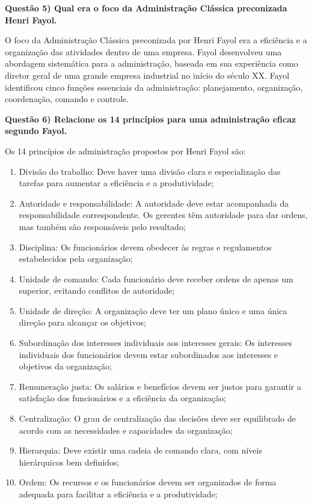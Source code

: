 \documentclass[11pt]{article}
\begin{document}
\noindent \textbf{Questão 5) Qual era o foco da Administração Clássica preconizada Henri Fayol.}\par
O foco da Administração Clássica preconizada por Henri Fayol era a eficiência e a organização das atividades dentro de uma empresa. Fayol desenvolveu uma abordagem sistemática para a administração, baseada em sua experiência como diretor geral de uma grande empresa industrial no início do século XX. Fayol identificou cinco funções essenciais da administração: planejamento, organização, coordenação, comando e controle.\par

\noindent \textbf{Questão 6) Relacione os 14 princípios para uma administração eficaz segundo Fayol.}\par
Os 14 princípios de administração propostos por Henri Fayol são:
\begin{enumerate}
    \item Divisão do trabalho: Deve haver uma divisão clara e especialização das tarefas para aumentar a eficiência e a produtividade;
    \item Autoridade e responsabilidade: A autoridade deve estar acompanhada da responsabilidade correspondente. Os gerentes têm autoridade para dar ordens, mas também são responsáveis pelo resultado;
    \item Disciplina: Os funcionários devem obedecer às regras e regulamentos estabelecidos pela organização;
    \item Unidade de comando: Cada funcionário deve receber ordens de apenas um superior, evitando conflitos de autoridade;
    \item Unidade de direção: A organização deve ter um plano único e uma única direção para alcançar os objetivos;
    \item Subordinação dos interesses individuais aos interesses gerais: Os interesses individuais dos funcionários devem estar subordinados aos interesses e objetivos da organização;
    \item Remuneração justa: Os salários e benefícios devem ser justos para garantir a satisfação dos funcionários e a eficiência da organização;
    \item Centralização: O grau de centralização das decisões deve ser equilibrado de acordo com as necessidades e capacidades da organização;
    \item Hierarquia: Deve existir uma cadeia de comando clara, com níveis hierárquicos bem definidos;
    \item Ordem: Os recursos e os funcionários devem ser organizados de forma adequada para facilitar a eficiência e a produtividade;

\end{enumerate}
\end{document}
